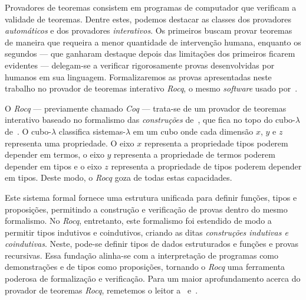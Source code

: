 \vspace{.5\baselineskip}
Provadores de teoremas consistem em programas de computador que verificam a validade de teoremas. Dentre estes, podemos destacar as classes dos provadores \emph{automáticos} e dos provadores \emph{interativos}. Os primeiros buscam provar teoremas de maneira que requeira a menor quantidade de intervenção humana, enquanto os segundos --- que ganharam destaque depois das limitações dos primeiros ficarem evidentes --- delegam-se a verificar rigorosamente provas desenvolvidas por humanos em sua linguagem. Formalizaremos as provas apresentadas neste trabalho no provador de teoremas interativo \textit{Rocq}, o mesmo \emph{software} usado por~\cite{Gonthier.2008}.

\vspace{.5\baselineskip}
O \emph{Rocq} --- previamente chamado \emph{Coq} --- trata-se de um provador de teoremas interativo baseado no formalismo das \emph{construções} de~\cite{Coquand+Huet.1988}, que fica no topo do cubo-$\lambda$ de~\cite{Barendregt.1991}.
O cubo-$\lambda$ classifica sistemas-$\lambda$ em um cubo onde cada dimensão $x$, $y$ e $z$ representa uma propriedade.
O eixo $x$ representa a propriedade tipos poderem depender em termos, o eixo $y$ representa a propriedade de termos poderem depender em tipos e o eixo $z$ representa a propriedade de tipos poderem depender em tipos.
Deste modo, o \emph{Rocq} goza de todas estas capacidades.

\vspace{.5\baselineskip}
Este sistema formal fornece uma estrutura unificada para definir funções, tipos e proposições, permitindo a construção e verificação de provas dentro do mesmo formalismo. No \emph{Rocq}, entretanto, este formalismo foi estendido de modo a permitir tipos indutivos e coindutivos, criando as ditas \emph{construções indutivas e coindutivas}.
Neste, pode-se definir tipos de dados estruturados e funções e provas recursivas.
Essa fundação alinha-se com a interpretação de programas como demonstrações e de tipos como proposições, tornando o \textit{Rocq} uma ferramenta poderosa de formalização e verificação.
Para um maior aprofundamento acerca do provador de teoremas \emph{Rocq}, remetemos o leitor a~\cite{Chlipala.2013} e~\cite{Pierce.2025}.
